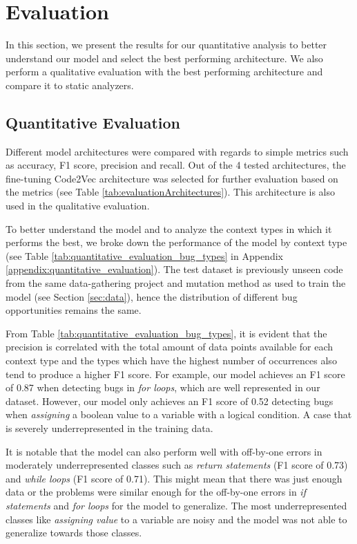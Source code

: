 \section{Evaluation} \label{sec:evaluation}
In this section, we present the results for our quantitative analysis to better understand our model and select the best performing architecture. We also perform a qualitative evaluation with the best performing architecture and compare it to static analyzers.
\subsection{Quantitative Evaluation} \label{sec:quantitative_analysis}
Different model architectures were compared with regards to simple metrics such as accuracy, F1 score, precision and recall. Out of the 4 tested architectures, the fine-tuning Code2Vec architecture was selected for further evaluation based on the metrics (see Table \ref{tab:evaluationArchitectures}). This architecture is also used in the qualitative evaluation.

To better understand the model and to analyze the context types in which it performs the best, we broke down the performance of the model by context type (see Table \ref{tab:quantitative_evaluation_bug_types} in Appendix \ref{appendix:quantitative_evaluation}). The test dataset is previously unseen code from the same data-gathering project and mutation method as used to train the model (see Section \ref{sec:data}), hence the distribution of different bug opportunities remains the same.


From Table \ref{tab:quantitative_evaluation_bug_types}, it is evident that the precision is correlated with the total amount of data points available for each context type and the types which have the highest number of occurrences also tend to produce a higher F1 score. For example, our model achieves an F1 score of 0.87 when detecting bugs in \textit{for loops}, which are well represented in our dataset. However, our model only achieves an F1 score of 0.52 detecting bugs when \textit{assigning} a boolean value to a variable with a logical condition. A case that is severely underrepresented in the training data.

It is notable that the model can also perform well with off-by-one errors in moderately underrepresented classes such as \textit{return statements} (F1 score of 0.73)  and \textit{while loops} (F1 score of 0.71). This might mean that there was just enough data or the problems were similar enough for the off-by-one errors in \textit{if statements} and \textit{for loops} for the model to generalize. The most underrepresented classes like \textit{assigning value} to a variable are noisy and the model was not able to generalize towards those classes.

